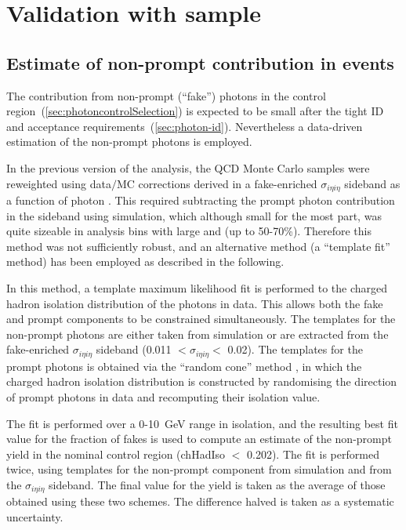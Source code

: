 
\section{Validation with \texorpdfstring{\gj}{gamma+jets} sample}
\label{app:gjets}

\subsection{Estimate of non-prompt contribution in \gj events}
\label{sec:photon-purity}

The contribution from non-prompt (``fake'') photons in the \gj control 
region~(\ref{sec:photoncontrolSelection}) is expected to be small after
the tight ID and acceptance requirements~(\ref{sec:photon-id}). 
Nevertheless a data-driven estimation of the non-prompt photons is
employed. 

In the previous version of the analysis, the QCD Monte Carlo samples
were reweighted using data$/$MC corrections derived in a fake-enriched
$\sigma_{i\eta i\eta}$ sideband as a function of photon \Pt. This
required subtracting the prompt photon contribution in the sideband
using simulation, which although small for the most part, was quite
sizeable in analysis bins with large \njet and \HT (up to 50-70\%).
Therefore this method was not sufficiently robust, and an alternative
method (a ``template fit'' method) has been employed as described in
the following.

In this method, a template maximum likelihood fit is performed to the
charged hadron isolation distribution of the photons in data. This
allows both the fake and prompt components to be constrained
simultaneously. The templates for the non-prompt photons are either
taken from simulation or are extracted from the fake-enriched
$\sigma_{i\eta i\eta}$ sideband (0.011 $< \sigma_{i\eta i\eta} <$
0.02).  The templates for the prompt photons is obtained via the
``random cone'' method \cite{random-cone}, in which the charged hadron
isolation distribution is constructed by randomising the direction of
prompt photons in data and recomputing their isolation value.

The fit is performed over a 0-10~GeV range in isolation, and the
resulting best fit value for the fraction of fakes is used to compute
an estimate of the non-prompt yield in the nominal \gj control region
(chHadIso $<$ 0.202). The fit is performed twice, using templates for
the non-prompt component from simulation and from the $\sigma_{i\eta
  i\eta}$ sideband. The final value for the yield is taken as the
average of those obtained using these two schemes. The difference
halved is taken as a systematic uncertainty.

